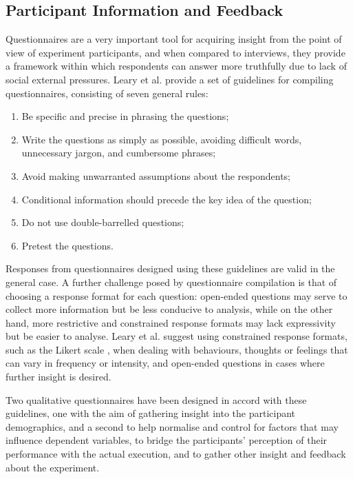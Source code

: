 \subsection{Participant Information and Feedback}
Questionnaires are a very important tool for acquiring insight from the point of view of experiment participants, and when compared to interviews, they provide a framework within which respondents can answer more truthfully due to lack of social external pressures. Leary et al. \cite{introductiontobehavioralresearchmethods} provide a set of guidelines for compiling questionnaires, consisting of seven general rules:
\begin{enumerate}
	\item Be specific and precise in phrasing the questions;
	\item Write the questions as simply as possible, avoiding difficult words, unnecessary jargon, and cumbersome phrases;
	\item Avoid making unwarranted assumptions about the respondents;
	\item Conditional information should precede the key idea of the question;
	\item Do not use double-barrelled questions;
	\item Pretest the questions.
\end{enumerate}
Responses from questionnaires designed using these guidelines are valid in the general case. A further challenge posed by questionnaire compilation is that of choosing a response format for each question: open-ended questions may serve to collect more information but be less conducive to analysis, while on the other hand, more restrictive and constrained response formats may lack expressivity but be easier to analyse. Leary et al. suggest using constrained response formats, such as the Likert scale \cite{likert1932technique}, when dealing with behaviours, thoughts or feelings that can vary in frequency or intensity, and open-ended questions in cases where further insight is desired. 

Two qualitative questionnaires have been designed in accord with these guidelines, one with the aim of gathering insight into the participant demographics, and a second to help normalise and control for factors that may influence dependent variables, to bridge the participants' perception of their performance with the actual execution, and to gather other insight and feedback about the experiment.


